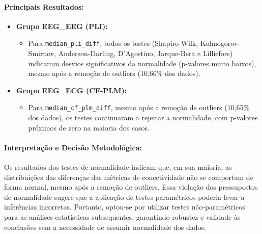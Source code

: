 \paragraph{Principais Resultados:}
\begin{itemize}
    \item \textbf{Grupo EEG\_EEG (PLI):}
    \begin{itemize}
        \item Para \texttt{median\_pli\_diff}, todos os testes (Shapiro-Wilk, Kolmogorov-Smirnov, Anderson-Darling, D'Agostino, Jarque-Bera e Lilliefors) indicaram desvios significativos da normalidade (p-valores muito baixos), mesmo após a remoção de outliers (10,66\% dos dados).
    \end{itemize}
    \item \textbf{Grupo EEG\_ECG (CF-PLM):}
    \begin{itemize}
        \item Para \texttt{median\_cf\_plm\_diff}, mesmo após a remoção de outliers (10,65\% dos dados), os testes continuaram a rejeitar a normalidade, com p-valores próximos de zero na maioria dos casos.
    \end{itemize}
\end{itemize}

\paragraph{Interpretação e Decisão Metodológica:}
Os resultados dos testes de normalidade indicam que, em sua maioria, as distribuições das diferenças das métricas de conectividade não se comportam de forma normal, mesmo após a remoção de outliers. Essa violação dos pressupostos de normalidade sugere que a aplicação de testes paramétricos poderia levar a inferências incorretas. Portanto, optou-se por utilizar testes não-paramétricos para as análises estatísticas subsequentes, garantindo robustez e validade às conclusões sem a necessidade de assumir normalidade dos dados.
